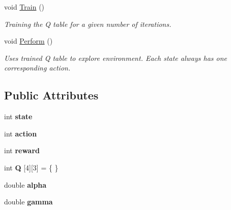\begin{DoxyCompactItemize}
void \hyperlink{classQDemo_a34db5b42abf20a917a5e509e674ef496}{Train} ()
\begin{DoxyCompactList}\small\item\em Training the Q table for a given number of iterations. \end{DoxyCompactList}\item 
void \hyperlink{classQDemo_ac302b5c75eabd51ebce50e24e7b0869f}{Perform} ()
\begin{DoxyCompactList}\small\item\em Uses trained Q table to explore environment. Each state always has one corresponding action. \end{DoxyCompactList}\end{DoxyCompactItemize}
\subsection*{Public Attributes}
\begin{DoxyCompactItemize}
\item 
\hypertarget{classQDemo_af13e96338db0faed961b9f5b539eaeb4}{int {\bfseries state}}\label{classQDemo_af13e96338db0faed961b9f5b539eaeb4}

\item 
\hypertarget{classQDemo_af512f45e34f230bdd35605beaa0333e3}{int {\bfseries action}}\label{classQDemo_af512f45e34f230bdd35605beaa0333e3}

\item 
\hypertarget{classQDemo_a0a7ea64ed305e6262758f330a3faca71}{int {\bfseries reward}}\label{classQDemo_a0a7ea64ed305e6262758f330a3faca71}

\item 
\hypertarget{classQDemo_a0e7384b636078a406f75c39ce316edf5}{int {\bfseries Q} \mbox{[}4\mbox{]}\mbox{[}3\mbox{]} = \{ \}}\label{classQDemo_a0e7384b636078a406f75c39ce316edf5}

\item 
\hypertarget{classQDemo_a30939a56729cfa6bca6e57ecc02c7876}{double {\bfseries alpha}}\label{classQDemo_a30939a56729cfa6bca6e57ecc02c7876}

\item 
\hypertarget{classQDemo_ac36eb462dd58528d53a0cc3435e59f3a}{double {\bfseries gamma}}\label{classQDemo_ac36eb462dd58528d53a0cc3435e59f3a}

\end{DoxyCompactItemize}


